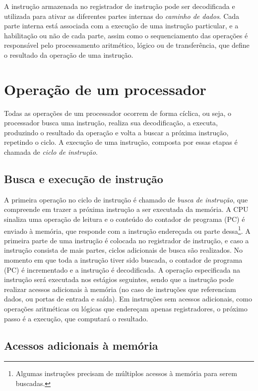 \documentclass[11pt,a4paper]{report}
\begin{document}
A instrução armazenada no registrador de instrução pode ser decodificada
e utilizada para ativar as diferentes partes internas do \textit{caminho
de dados}. Cada parte interna está associada com a execução de uma
instrução particular, e a habilitação ou não de cada parte, assim como
o sequenciamento das operações é responsável pelo processamento aritmético,
lógico ou de transferência, que define o resultado da operação de uma
instrução.

\section{Operação de um processador}

Todas as operações de um processador ocorrem de forma cíclica, ou seja,
o processador busca uma instrução, realiza sua decodificação, a executa,
produzindo o resultado da operação e volta a buscar a próxima instrução,
repetindo o ciclo. A execução de uma instrução, composta por essas etapas
é chamada de \textit{ciclo de instrução}.

\subsection{Busca e execução de instrução}

A primeira operação no ciclo de instrução é chamado de \textit{busca de
instrução}, que compreende em trazer a próxima instrução a ser executada
da memória. A CPU sinaliza uma operação de leitura e o conteúdo do 
contador de programa (PC) é enviado à memória, que responde com a
instrução endereçada ou parte dessa\footnote{Algumas instruções precisam
de múltiplos acessos à memória para serem buscadas.}. A primeira parte
de uma instrução é colocada no registrador de instrução, e caso a
instrução consista de mais partes, ciclos adicionais de busca são
realizados. No momento em que toda a instrução tiver sido buscada, o
contador de programa (PC) é incrementado e a instrução é decodificada. A
operação especificada na instrução será executada nos estágios seguintes,
sendo que a instrução pode realizar acessos adicionais à memória (no 
caso de instruções que referenciam dados, ou portas de entrada e saída).
Em instruções sem acessos adicionais, como operações aritméticas ou 
lógicas que endereçam apenas registradores, o próximo passo é a execução,
que computará o resultado.

\subsection{Acessos adicionais à memória}
\end{document}
